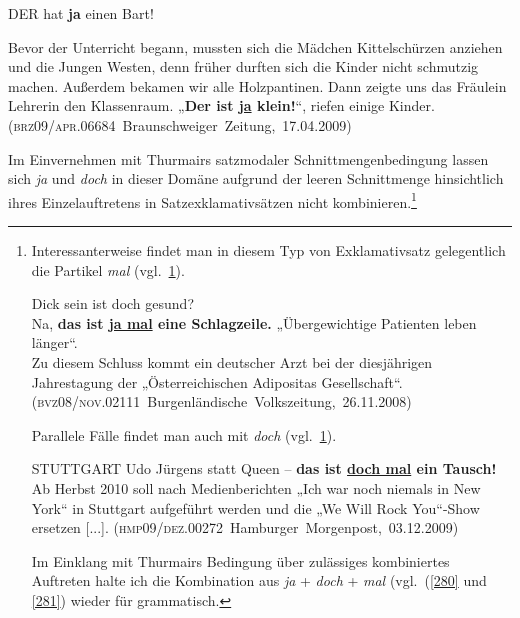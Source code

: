 \begin{exe}
	\ex\label{277} 
	DER hat \textbf{ja} einen Bart!	
			\hfill\hbox{\citet[221]{Rinas2006}}
\end{exe}

\begin{exe}
	\ex\label{278a}

	 Bevor der Unterricht begann, mussten sich die Mädchen Kittelschürzen anziehen und die Jungen Westen, denn früher durften sich die Kinder nicht 			schmutzig machen. Außerdem bekamen wir alle Holzpantinen. Dann zeigte uns das Fräulein Lehrerin den Klassenraum. „\textbf{Der ist \underline{ja} 		klein!}“, riefen einige Kinder. 
	\hfill\hbox{(\textsc{brz09/apr.06684} Braunschweiger Zeitung, 17.04.2009)} 
\end{exe}	
Im Einvernehmen mit Thurmairs satzmodaler Schnittmengenbedingung lassen sich \textit{ja} und \textit{doch} in dieser Domäne aufgrund der leeren Schnittmenge hinsichtlich ihres Einzelauftretens in Satzexklamativsätzen nicht kombinieren.\footnote{Interessanterweise findet man in diesem Typ von Exklamativsatz gelegentlich die Partikel \textit{mal} (vgl.\ \ref{278}).

\begin{exe}
	\ex\label{278} 
	Dick sein ist doch gesund?\\
	Na, \textbf{das ist \underline{ja mal} eine Schlagzeile.} „Übergewichtige Patienten leben länger“.\\ Zu diesem Schluss kommt ein deutscher 		Arzt bei der diesjährigen Jahrestagung der „Österreichischen Adipositas Gesellschaft“. 	
	\newline
	\hbox{}\hfill\hbox{(\textsc{bvz08/nov.02111} Burgenländische Volkszeitung, 26.11.2008)}
\end{exe}
Parallele Fälle findet man auch mit \textit{doch} (vgl.\ \ref{279}).

\begin{exe}
	\ex\label{279} 
	STUTTGART Udo Jürgens statt Queen – \textbf{das ist \underline{doch mal} ein Tausch!} Ab Herbst 2010 soll nach Medienberichten „Ich war noch 			niemals in New York“ in Stuttgart aufgeführt werden und die „We Will Rock You“-Show ersetzen [...].      	
	\newline
	\hbox{}\hfill\hbox{(\textsc{hmp09/dez.00272} Hamburger Morgenpost, 03.12.2009)}
\end{exe}					             
Im Einklang mit Thurmairs Bedingung über zulässiges kombiniertes Auftreten halte ich die Kombination aus \textit{ja} + \textit{doch} + \textit{mal} (vgl.\ (\ref{280} und \ref{281}) wieder für grammatisch.

}

